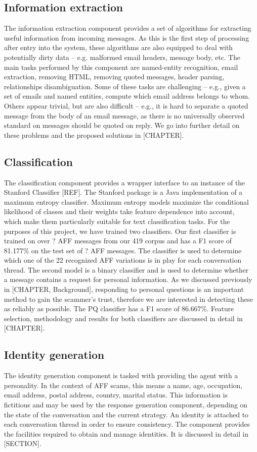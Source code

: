 \subsection*{Information extraction}
The information extraction component provides a set of algorithms for extracting useful information from incoming messages. As this is the first step of processing after entry into the system, these algorithms are also equipped to deal with potentially dirty data – e.g. malformed email headers, message body, etc. The main tasks performed by this component are named-entity recognition, email extraction, removing HTML, removing quoted messages, header parsing, relationships disambiguation. Some of these tasks are challenging – e.g., given a set of emails and named entities, compute which email address belongs to whom. Others appear trivial, but are also difficult – e.g., it is hard to separate a quoted message from the body of an email message, as there is no universally observed standard on messages should be quoted on reply. We go into further detail on these problems and the proposed solutions in [CHAPTER].

\subsection*{Classification}
The classification component provides a wrapper interface to an instance of the Stanford Classifier [REF]. The Stanford package is a Java implementation of a maximum entropy classifier. Maximum entropy models maximize the conditional likelihood of classes and their weights take feature dependence into account, which make them particularly suitable for text classification tasks. For the purposes of this project, we have trained two classifiers. Our first classifier is trained on over ? AFF messages from our 419 corpus and has a F1 score of  81.177\% on the test set of ? AFF messages. The classifier is used to determine which one of the 22 recognized AFF variations is in play for each conversation thread. The second model is a binary classifier and is used to determine whether a message contains a request for personal information. As we discussed previously in [CHAPTER, Background], responding to personal questions is an important method to gain the scammer's trust, therefore we are interested in detecting these as reliably as possible. The PQ classifier has a F1 score of 86.667\%. Feature selection, methodology and results for both classifiers are discussed in detail in [CHAPTER].

\subsection*{Identity generation}
The identity generation component is tasked with providing the agent with a personality. In the context of AFF scams, this means a name, age, occupation, email address, postal address, country, marital status. This information is fictitious and may be used by the response generation component, depending on the state of the conversation and the current strategy. An identity is attached to each conversation thread in order to ensure consistency. The component provides the facilities required to obtain and manage identities. It is discussed in detail in [SECTION].

